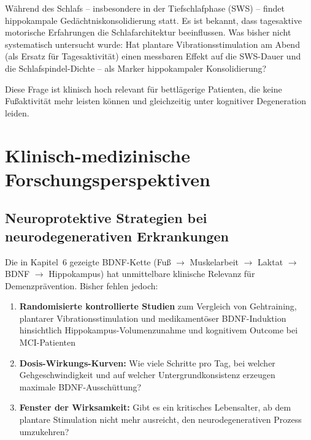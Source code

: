 ﻿\documentclass[12pt,a4paper]{report}
\theoremstyle{plain}
\theoremstyle{definition}
\theoremstyle{remark}
\begin{document}
Während des Schlafs -- insbesondere in der Tiefschlafphase (SWS) --
findet hippokampale Gedächtniskonsolidierung statt. Es ist bekannt,
dass tagesaktive motorische Erfahrungen die Schlafarchitektur
beeinflussen. Was bisher nicht systematisch untersucht wurde: Hat
plantare Vibrationsstimulation am Abend (als Ersatz für
Tagesaktivität) einen messbaren Effekt auf die SWS-Dauer und die
Schlafspindel-Dichte -- als Marker hippokampaler Konsolidierung?

Diese Frage ist klinisch hoch relevant für bettlägerige Patienten,
die keine Fußaktivität mehr leisten können und gleichzeitig unter
kognitiver Degeneration leiden.

\section{Klinisch-medizinische Forschungsperspektiven}

\subsection{Neuroprotektive Strategien bei neurodegenerativen Erkrankungen}

Die in Kapitel~6 gezeigte BDNF-Kette (Fuß $\to$ Muskelarbeit $\to$
Laktat $\to$ BDNF $\to$ Hippokampus) hat unmittelbare klinische
Relevanz für Demenzprävention. Bisher fehlen jedoch:

\begin{enumerate}
\item \textbf{Randomisierte kontrollierte Studien} zum Vergleich
  von Gehtraining, plantarer Vibrationsstimulation und medikamentöser
  BDNF-Induktion hinsichtlich Hippokampus-Volumenzunahme und
  kognitivem Outcome bei MCI-Patienten
\item \textbf{Dosis-Wirkungs-Kurven:} Wie viele Schritte pro Tag,
  bei welcher Gehgeschwindigkeit und auf welcher Untergrundkonsistenz
  erzeugen maximale BDNF-Ausschüttung?
\item \textbf{Fenster der Wirksamkeit:} Gibt es ein kritisches
  Lebensalter, ab dem plantare Stimulation nicht mehr ausreicht,
  den neurodegenerativen Prozess umzukehren?
\end{enumerate}
\end{document}
